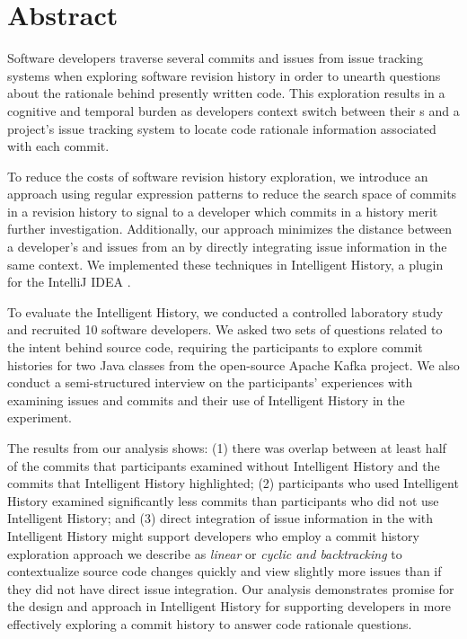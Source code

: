 
\chapter{Abstract}


Software developers traverse several commits and issues from issue tracking systems 
when exploring software revision history in order to unearth questions about the rationale behind presently written code.
This exploration results in a cognitive and temporal burden as developers
context switch between their s and a project's issue tracking system to locate code rationale information
associated with each commit.

To reduce the costs of software revision history exploration,
we introduce an approach using regular expression patterns to reduce the search space of commits in a revision history to signal to a developer which commits in a history merit further investigation.
Additionally, our approach minimizes the distance between a developer's  and issues from an 
by directly integrating issue information in the same context.
We implemented these techniques in Intelligent History, a plugin for the IntelliJ IDEA .

To evaluate the Intelligent History, we conducted a controlled laboratory study and recruited 10 software developers.
We asked two sets of questions related to the intent behind source code, requiring the participants to explore 
commit histories for two Java classes from the open-source Apache Kafka project.
We also conduct a semi-structured interview on the participants' experiences with examining issues and commits 
and their use of Intelligent History in the experiment.

The results from our analysis shows:
(1) there was overlap between at least half of the commits
that participants examined without Intelligent History and the commits that Intelligent History
highlighted; (2) participants who used Intelligent History examined significantly
less commits than participants who did not use Intelligent History;
and (3) direct integration of issue information in the 
with Intelligent History might support developers who employ a commit history exploration approach
we describe as \textit{linear} or \textit{cyclic and backtracking} to contextualize
source code changes quickly and view slightly more issues than if they did not have
direct issue integration.
Our analysis demonstrates promise for the design and approach in Intelligent History
for supporting developers in more effectively exploring a commit history to answer code rationale questions.

